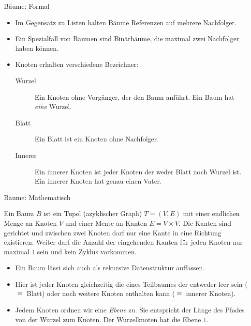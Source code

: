 \begin{frame}{Bäume: Formal}
    \begin{itemize}[<+(1)->]
        \item Im Gegensatz zu Listen halten Bäume Referenzen auf mehrere Nachfolger.
        \item Ein Spezialfall von Bäumen sind Binärbäume, die maximal zwei Nachfolger haben können.
        \item Knoten erhalten verschiedene Bezeichner: \begin{description}
            \item[Wurzel] Ein Knoten ohne Vorgänger, der den Baum anführt. Ein Baum hat \emph{eine} Wurzel.
            \item[Blatt] Ein Blatt ist ein Knoten ohne Nachfolger.
            \item[Innerer] Ein innerer Knoten ist jeder Knoten der weder Blatt noch Wurzel ist.\pause{} Ein innerer Knoten hat genau einen Vater.
        \end{description}
    \end{itemize}
\end{frame}

\begin{frame}{Bäume: Mathematisch}
    \begin{definition}[Baum]
Ein Baum \(B\) ist ein Tupel (azyklischer Graph) \(T = (V,E)\) mit einer endlichen Menge an Knoten \(V\) und einer Mente an Kanten \(E = V \times V\).\pause{} Die Kanten sind gerichtet und zwischen zwei Knoten darf nur eine Kante in eine Richtung existieren.\pause{} Weiter darf die Anzahl der eingehenden Kanten für jeden Knoten nur maximal \(1\) sein und kein Zyklus vorkommen.
    \end{definition}
    \begin{itemize}[<+(1)->]
        \item Ein Baum lässt sich auch als rekursive Datenstruktur auffassen.
        \item Hier ist jeder Knoten gleichzeitig die  eines Teilbaumes\pause{} der entweder leer sein (\(\widehat{=}\) Blatt)\pause{} oder noch weitere Knoten enthalten kann (\(\widehat{=}\) innerer Knoten).
        \item Jedem Knoten ordnen wir eine \emph{Ebene} zu. \pause{}Sie entspricht der Länge des Pfades von der Wurzel zum Knoten.\pause{} Der Wurzelknoten hat die Ebene \(1\).
    \end{itemize}
\end{frame}

